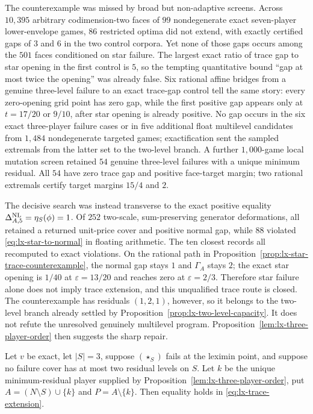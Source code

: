 The counterexample was missed by broad but non-adaptive screens.  Across $10{,}395$ arbitrary
codimension-two faces of $99$ nondegenerate exact seven-player lower-envelope
games, $86$ restricted optima did not extend, with exactly certified gaps of
$3$ and $6$ in the two control corpora.  Yet none of those gaps occurs among
the $501$ faces conditioned on star failure.  The largest exact ratio of trace
gap to star opening in the first control is $5$, so the tempting quantitative
bound ``gap at most twice the opening'' was already false.  Six rational affine bridges from a genuine three-level
failure to an exact trace-gap control tell the same story: every zero-opening
grid point has zero gap, while the first positive gap appears only at
$t=17/20$ or $9/10$, after star opening is already positive.  No gap occurs in
the six exact three-player failure cases or in five additional float
multilevel candidates from $1{,}484$ nondegenerate targeted games;
exactification sent the sampled extremals from the latter set to the two-level
branch.  A further $1{,}000$-game local mutation screen retained $54$ genuine
three-level failures with a unique minimum residual.  All $54$ have zero
trace gap and positive face-target margin; two rational extremals certify
target margins $15/4$ and $2$.

The decisive search was instead transverse to the exact positive equality
$\Delta^{\rm NL}_{A,5}=\eta_S(\phi)=1$.  Of $252$ two-scale, sum-preserving
generator deformations, all retained a returned unit-price cover and positive
normal gap, while $88$ violated \eqref{eq:lx-star-to-normal} in floating
arithmetic.  The ten closest records all recomputed to exact violations.  On
the rational path in Proposition~\ref{prop:lx-star-trace-counterexample}, the
normal gap stays $1$ and $\Gamma_A$ stays $2$; the exact star opening is
$1/40$ at $\varepsilon=13/20$ and reaches zero at $\varepsilon=2/3$.
Therefore star failure alone does not imply trace extension, and this
unqualified trace route is closed.  The counterexample has residuals
$(1,2,1)$, however, so it belongs to the two-level branch already settled by
Proposition~\ref{prop:lx-two-level-capacity}.  It does not refute the
unresolved genuinely multilevel program.  Proposition~\ref{lem:lx-three-player-order}
then suggests the sharp repair.

\newpage
\begin{conjecture}
\label{conj:lx-multilevel-trace-extension}
Let $v$ be exact, let $|S|=3$, suppose $(\star_S)$ fails at the leximin point,
and suppose no failure cover has at most two residual levels on $S$.  Let $k$
be the unique minimum-residual player supplied by
Proposition~\ref{lem:lx-three-player-order}, put
$A=(N\setminus S)\cup\{k\}$ and $P=A\setminus\{k\}$.  Then equality holds in
\eqref{eq:lx-trace-extension}.
\end{conjecture}

